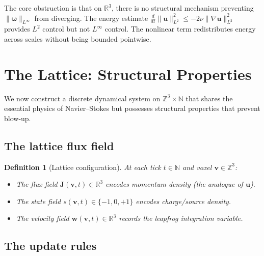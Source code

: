 \documentclass[11pt]{article}
\theoremstyle{tight}
\theoremstyle{plainroman}
\newtheorem{definition}[theorem]{Definition}
\newcommand{\R}{\mathbb{R}}
\newcommand{\Z}{\mathbb{Z}}
\newcommand{\N}{\mathbb{N}}
\begin{document}
The core obstruction is that on $\R^3$, there is no structural mechanism preventing $\|\bm\omega\|_{L^\infty}$ from diverging.
The energy estimate $\frac{d}{dt}\|\mathbf u\|_{L^2}^2\le -2\nu\|\nabla\mathbf u\|_{L^2}^2$ provides $L^2$ control but not $L^\infty$ control.
The nonlinear term redistributes energy across scales without being bounded pointwise.

\section{The Lattice: Structural Properties}

We now construct a discrete dynamical system on $\Z^3\times\N$ that shares the essential physics of Navier--Stokes but possesses structural properties that prevent blow-up.

\subsection{The lattice flux field}

\begin{definition}[Lattice configuration]
At each tick $t\in\N$ and voxel $\mathbf v\in\Z^3$:
\begin{itemize}[nosep]
\item The \emph{flux field} $\mathbf J(\mathbf v,t)\in\R^3$ encodes momentum density (the analogue of $\mathbf u$).
\item The \emph{state field} $s(\mathbf v,t)\in\{-1,0,+1\}$ encodes charge/source density.
\item The \emph{velocity field} $\mathbf w(\mathbf v,t)\in\R^3$ records the leapfrog integration variable.
\end{itemize}
\end{definition}

\subsection{The update rules}
\end{document}
